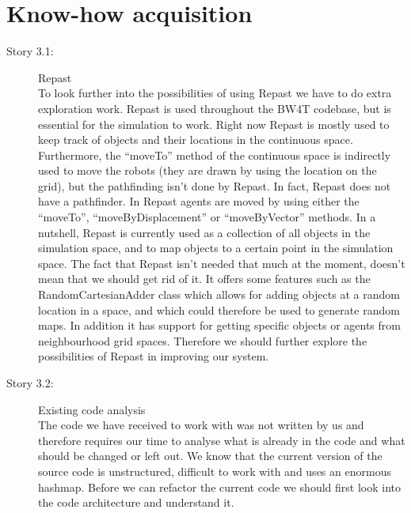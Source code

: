 \documentclass{article}
\begin{document}
\section{Know-how acquisition}
\begin{description}
\item[Story 3.1:] Repast\\
To look further into the possibilities of using Repast we have to do extra exploration work.
Repast is used throughout the BW4T codebase, but is essential for the simulation to work.
Right now Repast is mostly used to keep track of objects and their locations in the continuous space.
Furthermore, the ``moveTo'' method of the continuous space is indirectly used to move the robots (they are drawn by using the location on the grid), but the pathfinding isn't done by Repast.
In fact, Repast does not have a pathfinder.
In Repast agents are moved by using either the ``moveTo'', ``moveByDisplacement'' or ``moveByVector'' methods.
In a nutshell, Repast is currently used as a collection of all objects in the simulation space, and to map objects to a certain point in the simulation space.
The fact that Repast isn't needed that much at the moment, doesn't mean that we should get rid of it.
It offers some features such as the RandomCartesianAdder class which allows for adding objects at a random location in a space, and which could therefore be used to generate random maps.
In addition it has support for getting specific objects or agents from neighbourhood grid spaces.
Therefore we should further explore the possibilities of Repast in improving our system.

\item[Story 3.2:] Existing code analysis\\
The code we have received to work with was not written by us and therefore requires our time to analyse what is already in the code and what should be changed or left out.
We know that the current version of the source code is unstructured, difficult to work with and uses an enormous hashmap.
Before we can refactor the current code we should first look into the code architecture and understand it.
\end{description}
\end{document}
